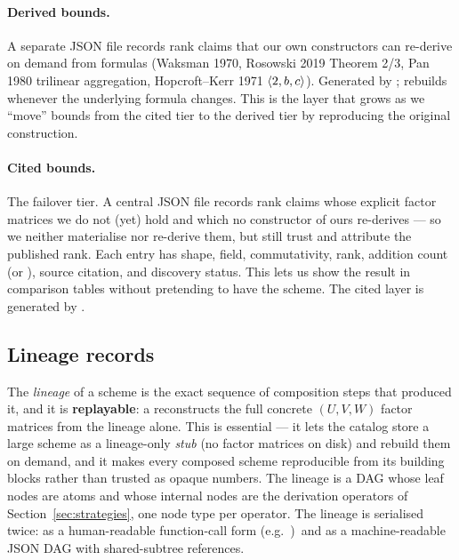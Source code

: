 \paragraph{Derived bounds.} A separate JSON file
 records rank claims that our own
constructors can re-derive on demand from formulas (Waksman 1970,
Rosowski 2019 Theorem 2/3, Pan 1980 trilinear aggregation, Hopcroft--Kerr
1971 \(\langle 2, b, c \rangle\)). Generated by
; rebuilds whenever the underlying
formula changes. This is the layer that grows as we ``move'' bounds
from the cited tier to the derived tier by reproducing the original
construction.

\paragraph{Cited bounds.} The failover tier. A central JSON file
 records rank claims whose explicit
factor matrices we do not (yet) hold and which no constructor of ours
re-derives --- so we neither materialise nor re-derive them, but still
trust and attribute the published rank. Each entry has shape, field,
commutativity, rank, addition count (or ), source
citation, and discovery status. This lets us show the result in
comparison tables without pretending to have the scheme. The cited
layer is generated by .

\subsection{Lineage records}

The \emph{lineage} of a scheme is the exact sequence of composition
steps that produced it, and it is \textbf{replayable}: a
 reconstructs the full concrete \((U, V, W)\)
factor matrices from the lineage alone. This is essential --- it lets
the catalog store a large scheme as a lineage-only \emph{stub} (no
factor matrices on disk) and rebuild them on demand, and it makes every
composed scheme reproducible from its building blocks rather than
trusted as opaque numbers. The lineage is a DAG whose leaf nodes are
atoms and whose internal nodes are the derivation operators of
Section~\ref{sec:strategies}, one node type per operator. The lineage
is serialised twice: as a
human-readable function-call form (e.g.\
)\, and as
a machine-readable JSON DAG with shared-subtree references.

